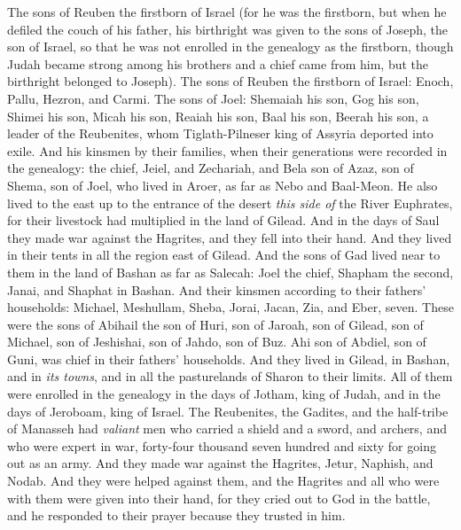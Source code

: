 \begin{biblechapter} %
 The sons of Reuben the firstborn of Israel (for he was the firstborn, but when he defiled the couch of his father, his birthright was given to the sons of Joseph, the son of Israel, so that he was not enrolled in the genealogy as the firstborn,
\verse though Judah became strong among his brothers and a chief came from him, but the birthright belonged to Joseph).
\verse The sons of Reuben the firstborn of Israel: Enoch, Pallu, Hezron, and Carmi.
\verse The sons of Joel: Shemaiah his son, Gog his son, Shimei his son,
\verse Micah his son, Reaiah his son, Baal his son,
\verse Beerah his son, a leader of the Reubenites, whom Tiglath-Pilneser king of Assyria deported into exile.
\verse And his kinsmen by their families, when their generations were recorded in the genealogy: the chief, Jeiel, and Zechariah,
\verse and Bela son of Azaz, son of Shema, son of Joel, who lived in Aroer, as far as Nebo and Baal-Meon.
\verse He also lived to the east up to the entrance of the desert \textit{this side of} the River Euphrates, for their livestock had multiplied in the land of Gilead.
\verse And in the days of Saul they made war against the Hagrites, and they fell into their hand. And they lived in their tents in all the region east of Gilead.
 And the sons of Gad lived near to them in the land of Bashan as far as Salecah:
\verse Joel the chief, Shapham the second, Janai, and Shaphat in Bashan.
\verse And their kinsmen according to their fathers’ households: Michael, Meshullam, Sheba, Jorai, Jacan, Zia, and Eber, seven.
\verse These were the sons of Abihail the son of Huri, son of Jaroah, son of Gilead, son of Michael, son of Jeshishai, son of Jahdo, son of Buz.
\verse Ahi son of Abdiel, son of Guni, was chief in their fathers’ households.
\verse And they lived in Gilead, in Bashan, and in \textit{its towns}, and in all the pasturelands of Sharon to their limits.
\verse All of them were enrolled in the genealogy in the days of Jotham, king of Judah, and in the days of Jeroboam, king of Israel.
\verse The Reubenites, the Gadites, and the half-tribe of Manasseh had \textit{valiant} men who carried a shield and a sword, and archers, and who were expert in war, forty-four thousand seven hundred and sixty for going out as an army.
\verse And they made war against the Hagrites, Jetur, Naphish, and Nodab.
\verse And they were helped against them, and the Hagrites and all who were with them were given into their hand, for they cried out to God in the battle, and he responded to their prayer because they trusted in him.

\end{biblechapter}
